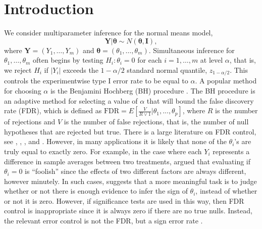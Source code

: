 \documentclass[11pt]{article}
\begin{document}
\section{Introduction}
We consider multiparameter inference for the normal means model,
\begin{equation}
	\boldsymbol{Y} | \boldsymbol{\theta} \sim N(\boldsymbol{\theta}, \boldsymbol{I}),
	\label{m1}
\end{equation}
where $\boldsymbol{Y} = (Y_1,\ldots,Y_m)$ and $\boldsymbol{\theta} = (\theta_1,\ldots, \theta_m)$. Simultaneous inference for $\theta_1,\ldots, \theta_m$ often begins by testing $H_i:\theta_i=0$ 
for each $i =1,\ldots, m$ at level $\alpha$, that is, we reject 
$H_i$ if $|Y_i|$ exceeds the $1-\alpha/2$ standard normal quantile,  $z_{1-\alpha/2}$. This controls 
the experimentwise type I error rate to be equal to $\alpha$. A popular method for choosing $\alpha$ is the Benjamini Hochberg (BH) procedure \citep{benjamini1995controlling}. 
The BH procedure is an adaptive method for selecting a value of 
$\alpha$ that will bound the false discovery rate (FDR), which is defined as $
\text{FDR} = E[\tfrac{V}{R \vee 1}|\theta_1,...,\theta_p]$,
where $R$ is the number of rejections and $V$ is the number of false 
rejections, that is, the number of null hypotheses that are rejected but true. 
There is a large literature on FDR control, see \citet{efron2012large}, \citet{benjamini2010discovering}, \citet{genovese2004stochastic}, \citet{storey2002direct} and \citet{storey2007optimal}. 
However, in many applications it is likely that none of the $\theta_i$'s are truly equal to exactly zero. For example, 
in the case where each $Y_i$ represents a difference in sample averages 
between two treatments, \citet{tukey1991} argued that evaluating if 
$\theta_i=0$ is ``foolish''
since the effects of two different factors are always different, however minutely.  In such cases, \citet{tukey1962} suggests that a more meaningful task is to judge whether or not  there is enough evidence to infer the sign of $\theta_i$, instead of whether or not it is zero. However, if significance tests 
are used in this way, then FDR control is inappropriate since it 
is always zero if there are no true nulls. 
Instead, the relevant error control is not the FDR, but
a sign error rate \citep{gelman2000type, gelman2014beyond, owen2016confidence}. 
\end{document}
